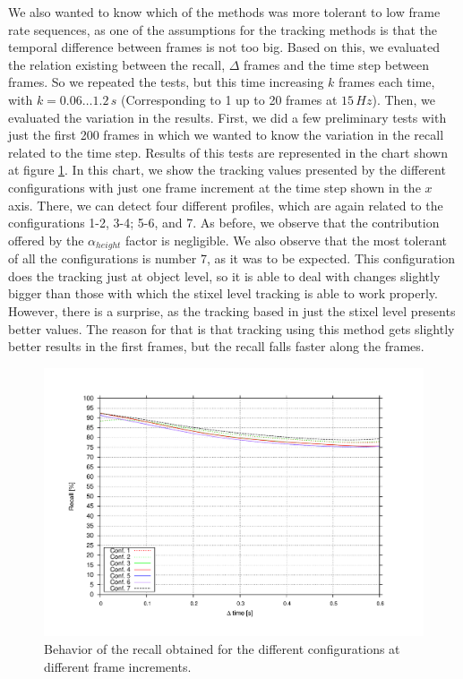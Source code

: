 We also wanted to know which of the methods was more tolerant to low frame rate sequences, as one of the assumptions for the tracking methods is that the temporal difference between frames is not too big. Based on this, we evaluated the relation existing between the recall, $\Delta$ frames and the time step between frames. So we repeated the tests, but this time increasing $k$ frames each time, with $k=0.06\dots1.2\,s$ (Corresponding to 1 up to 20 frames at $15\,Hz$). Then, we evaluated the variation in the results. First, we did a few preliminary tests with just the first 200 frames in which we wanted to know the variation in the recall related to the time step. Results of this tests are represented in the chart shown at figure \ref{fig:cp04_recall_vs_step}. In this chart, we show the tracking values presented by the different configurations with just one frame increment at the time step shown in the $x$ axis. There, we can detect four different profiles, which are again related to the configurations 1-2, 3-4; 5-6, and 7. As before, we observe that the contribution offered by the $\alpha_{height}$ factor is negligible. We also observe that the most tolerant of all the configurations is number 7, as it was to be expected. This configuration does the tracking just at object level, so it is able to deal with changes slightly bigger than those with which the stixel level tracking is able to work properly. However, there is a surprise, as the tracking based in just the stixel level presents better values. The reason for that is that tracking using this method gets slightly better results in the first frames, but the recall falls faster along the frames.

\begin{figure}[h!]
\centering
\includegraphics[trim=50 40 80 60,clip]{recall_vs_step}
\caption{Behavior of the recall obtained for the different configurations at different frame increments.}\label{fig:cp04_recall_vs_step}
\end{figure}

